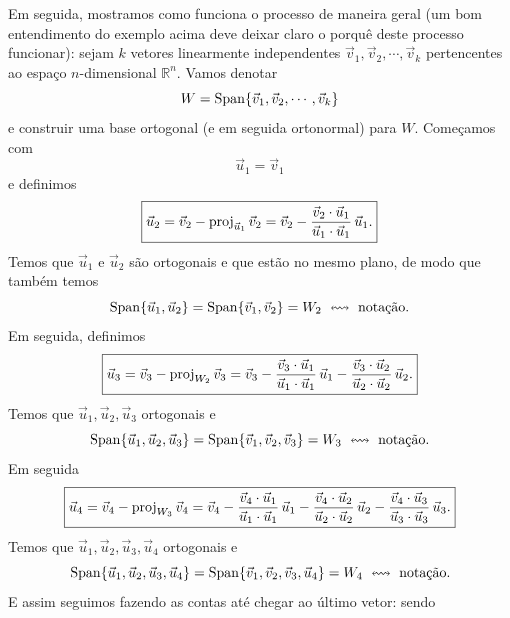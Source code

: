 Em seguida, mostramos como funciona o processo de maneira geral (um bom entendimento do exemplo acima deve deixar claro o porquê deste processo funcionar): sejam $k$ vetores linearmente independentes $\vec{v}_1, \vec{v}_2, \cdots, \vec{v}_k$ pertencentes ao espaço $n$-dimensional $\mathbb{R}^n$. Vamos denotar
\begin{equation}
W = \operatorname{Span} \{\vec{v}_1, \vec{v}_2, \cdots, \vec{v}_k\}
\end{equation} e construir uma base ortogonal (e em seguida ortonormal) para $W$. Começamos com
\begin{equation}
\boxed{\vec{u}_1 = \vec{v}_1}
\end{equation} e definimos
\begin{equation}\label{eqn:Gram-Schmidt-1}
\boxed{\vec{u}_2 = \vec{v}_2 - \operatorname{proj}_{\vec{u}_1} \vec{v}_2 = \vec{v}_2 - \frac{\vec{v}_2 \cdot \vec{u}_1}{\vec{u}_1 \cdot \vec{u}_1} \, \vec{u}_1.}
\end{equation}
 Temos que $\vec{u}_1$ e $\vec{u}_2$ são ortogonais e que estão no mesmo plano, de modo que também temos
\begin{equation}
\operatorname{Span} \{ \vec{u}_1, \vec{u}_2 \} = \operatorname{Span} \{ \vec{v}_1, \vec{v}_2 \} = W_2 \ \leftrightsquigarrow \text{ notação.}
\end{equation} Em seguida, definimos
\begin{equation}\label{eqn:Gram-Schmidt-2}
\boxed{\vec{u}_3 = \vec{v}_3 - \operatorname{proj}_{W_2} \vec{v}_3 = \vec{v}_3 - \frac{\vec{v}_3 \cdot \vec{u}_1}{\vec{u}_1 \cdot \vec{u}_1} \, \vec{u}_1 - \frac{\vec{v}_3 \cdot \vec{u}_2}{\vec{u}_2 \cdot \vec{u}_2} \, \vec{u}_2.}
\end{equation} Temos que $\vec{u}_1, \vec{u}_2, \vec{u}_3$ ortogonais e
\begin{equation}
\Span \{ \vec{u}_1, \vec{u}_2, \vec{u}_3 \} = \Span \{ \vec{v}_1, \vec{v}_2, \vec{v}_3 \} = W_3 \ \leftrightsquigarrow \text{ notação.}
\end{equation} Em seguida
\begin{equation}
\boxed{\vec{u}_4 = \vec{v}_4 - \operatorname{proj}_{W_3} \vec{v}_4 = \vec{v}_4 - \frac{\vec{v}_4 \cdot \vec{u}_1}{\vec{u}_1 \cdot \vec{u}_1} \, \vec{u}_1 - \frac{\vec{v}_4 \cdot \vec{u}_2}{\vec{u}_2 \cdot \vec{u}_2} \, \vec{u}_2 - \frac{\vec{v}_4 \cdot \vec{u}_3}{\vec{u}_3 \cdot \vec{u}_3} \, \vec{u}_3.}
\end{equation} Temos que $\vec{u}_1, \vec{u}_2, \vec{u}_3, \vec{u}_4$ ortogonais e
\begin{equation}
\operatorname{Span} \{ \vec{u}_1, \vec{u}_2, \vec{u}_3, \vec{u}_4 \} = \operatorname{Span} \{ \vec{v}_1, \vec{v}_2, \vec{v}_3, \vec{u}_4 \} = W_4 \ \leftrightsquigarrow \text{ notação.}
\end{equation} E assim seguimos fazendo as contas até chegar ao último vetor: sendo
